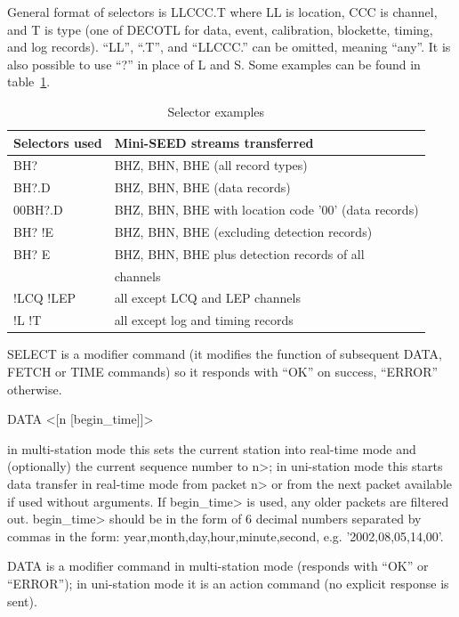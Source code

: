 \documentclass[11pt,a4paper,titlepage]{article}
\begin{document}
\begin{interface}
General format of selectors is LLCCC.T where LL is location, CCC is
channel, and T is type (one of DECOTL for data, event, calibration,
blockette, timing, and log records). ``LL'', ``.T'', and ``LLCCC.'' can be
omitted, meaning ``any''. It is also possible to use ``?'' in place of L
and S.  Some examples can be found in table~\ref{selectors}.

\begin{table}[ht]
\centering
\begin{tabular}{|l|l|} \hline
Selectors used & Mini-SEED streams transferred               \\ \hline\hline
BH?            & BHZ, BHN, BHE (all record types)            \\ \hline
BH?.D          & BHZ, BHN, BHE (data records)                \\ \hline
00BH?.D        & BHZ, BHN, BHE with location code '00' (data records) \\ \hline
BH? !E         & BHZ, BHN, BHE (excluding detection records) \\ \hline
BH? E          & BHZ, BHN, BHE plus detection records of all \\
               & channels                                    \\ \hline
!LCQ !LEP      & all except LCQ and LEP channels             \\ \hline
!L !T          & all except log and timing records           \\ \hline
\end{tabular}
\caption{Selector examples} \label{selectors}
\end{table}

SELECT is a modifier command (it modifies the function of subsequent DATA,
FETCH or TIME commands) so it responds with ``OK'' on success, ``ERROR''
otherwise.

\item DATA <[n [begin_time]]>

in multi-station mode this sets the current station into real-time
mode and (optionally) the current sequence number to \<n>; in
uni-station mode this starts data transfer in real-time mode from
packet \<n> or from the next packet available if used without
arguments. If \<begin_time> is used, any older packets are filtered
out. \<begin_time> should be in the form of 6 decimal numbers
separated by commas in the form: year,month,day,hour,minute,second,
e.g. '2002,08,05,14,00'.

DATA is a modifier command in multi-station mode (responds with ``OK''
or ``ERROR''); in uni-station mode it is an action command (no
explicit response is sent).


\end{interface}
\end{document}
